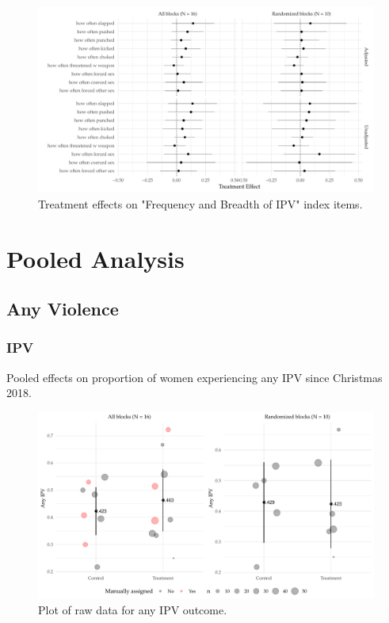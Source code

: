 \documentclass[11pt,english]{article}
\begin{document}
\begin{figure}[H]
\centering
\includegraphics[width = \textwidth]{figures/subitem_freq_plot.pdf}
\caption{Treatment effects on "Frequency and Breadth of IPV" index items.}
\label{fig:subitems_freq_plot}
\end{figure}

\section{Pooled Analysis}

\subsection{Any Violence}

\subsubsection{IPV}

\begin{table}[H]
\centering

\caption{Pooled effects on proportion of women experiencing any IPV since Christmas 2018.}
\label{tab:ipv}
\end{table}

\begin{figure}[H]
\centering
\includegraphics[width = \textwidth]{figures/pooled_ipv_plot.pdf}
\caption{Plot of raw data for any IPV outcome.}
\label{fig:pooled_ipv_plot}
\end{figure}
\end{document}
